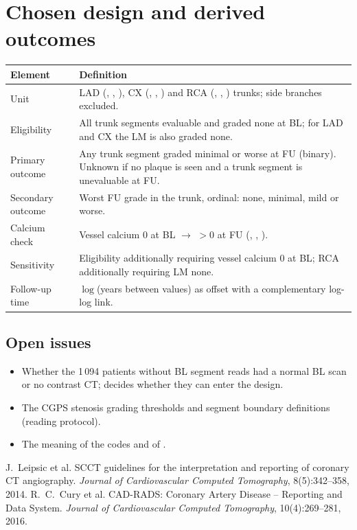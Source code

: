 \documentclass[11pt,a4paper]{article}
\begin{document}
\section{Chosen design and derived outcomes}
\label{sec:design}

\begin{longtable}{L{4.3cm} L{19cm}}
\toprule
Element & Definition \\
\midrule
\endhead
Unit & LAD (, , ), CX (, , ) and RCA (, , ) trunks; side branches excluded. \\
Eligibility & All trunk segments evaluable and graded none at BL; for LAD and CX the LM is also graded none. \\
Primary outcome & Any trunk segment graded minimal or worse at FU (binary). Unknown if no plaque is seen and a trunk segment is unevaluable at FU. \\
Secondary outcome & Worst FU grade in the trunk, ordinal: none, minimal, mild or worse. \\
Calcium check & Vessel calcium 0 at BL $\rightarrow$ $>$0 at FU (, , ). \\
Sensitivity & Eligibility additionally requiring vessel calcium 0 at BL; RCA additionally requiring LM none. \\
Follow-up time & $\log$(years between  values) as offset with a complementary log-log link. \\
\bottomrule
\end{longtable}

\subsection*{Open issues}
\begin{itemize}
  \item Whether the 1\,094 patients without BL segment reads had a normal BL scan or no contrast CT;
        decides whether they can enter the design.
  \item The CGPS stenosis grading thresholds and segment boundary definitions (reading protocol).
  \item The meaning of the  codes and of .
\end{itemize}

\begin{thebibliography}{9}
 J.~Leipsic et al. SCCT guidelines for the interpretation and reporting of coronary CT angiography.
  \emph{Journal of Cardiovascular Computed Tomography}, 8(5):342--358, 2014.
 R.~C.~Cury et al. CAD-RADS: Coronary Artery Disease -- Reporting and Data System.
  \emph{Journal of Cardiovascular Computed Tomography}, 10(4):269--281, 2016.
\end{thebibliography}
\end{document}
